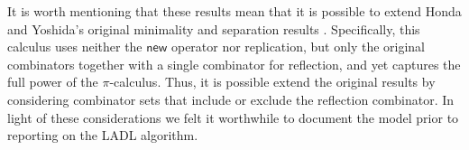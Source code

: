 \documentclass[submission,copyright,creativecommons]{eptcs}
\makeatletter
\newcommand{\pic}{$\pi$-calculus}
\newcommand{\ccomb}{$\mathsf{CC}$-calculus}
\newcommand{\quotep}[1]{\mathsf{@}#1}
\newcommand{\rhoc}{$\rho$-calculus}
\theoremstyle{definition}
\theoremstyle{remark}
\theoremstyle{remark}
\makeatother
\begin{document}
It is worth mentioning that these results mean that it is possible to
extend Honda and Yoshida's original minimality and separation results
\cite{DBLP:journals/tcs/Yoshida02}. Specifically, this calculus uses
neither the $\mathsf{new}$ operator nor replication, but only the
original combinators together with a single combinator for reflection,
and yet captures the full power of the {\pic}. Thus, it is possible
extend the original results by considering combinator sets that
include or exclude the reflection combinator. In light of these
considerations we felt it worthwhile to document the model prior to
reporting on the LADL algorithm.


\end{document}
